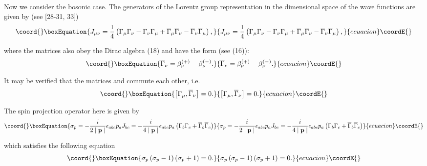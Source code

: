 \documentclass[a4paper,12pt]{article}
\begin{document}
Now we consider the bosonic case. The generators of the Lorentz group
representation in the \coordHE{}dimensional space of the wave functions \coordHE{}
are given by (see [28-31, 33])
\begin{equation}\coord{}\boxEquation{
J_{\mu \nu }=\frac 14\left( \Gamma _\mu \Gamma _\nu -\Gamma _\nu
\Gamma _\mu +\overline{\Gamma }_\mu \overline{\Gamma }_\nu
-\overline{\Gamma }_\nu \overline{\Gamma }_\mu \right) ,
\label{23}
}{
J_{\mu \nu }=\frac 14\left( \Gamma _\mu \Gamma _\nu -\Gamma _\nu
\Gamma _\mu +\overline{\Gamma }_\mu \overline{\Gamma }_\nu
-\overline{\Gamma }_\nu \overline{\Gamma }_\mu \right) ,
}{ecuacion}\coordE{}\end{equation}

where the matrices \myHighlight{$\overline{\Gamma }_\nu $}\coordHE{} also obey the Dirac algebra
(18) and have the form (see (16)):
\begin{equation}\coord{}\boxEquation{
\overline{\Gamma }_\nu =\beta _\nu ^{(+)}-\beta _\nu ^{(-)} .
\label{24}
}{
\overline{\Gamma }_\nu =\beta _\nu ^{(+)}-\beta _\nu ^{(-)} .
}{ecuacion}\coordE{}\end{equation}

It may be verified that the matrices \myHighlight{$\Gamma _\mu $}\coordHE{} and
\myHighlight{$\overline{\Gamma } _\nu $}\coordHE{} commute each other, i.e.
\begin{equation}\coord{}\boxEquation{
\left[ \Gamma _\mu ,\overline{\Gamma }_\nu \right] =0 . \label{25}
}{
\left[ \Gamma _\mu ,\overline{\Gamma }_\nu \right] =0 . }{ecuacion}\coordE{}\end{equation}

The spin projection operator here is given by
\begin{equation}\coord{}\boxEquation{
\sigma _p=-\frac i{2\mid \mathbf{p}\mid }\epsilon
_{abc}p_aJ_{bc}=-\frac i{4\mid \mathbf{p}\mid }\epsilon
_{abc}p_a\left( \Gamma _b\Gamma _c+ \overline{\Gamma
}_b\overline{\Gamma }_c\right)  \label{26}
}{
\sigma _p=-\frac i{2\mid \mathbf{p}\mid }\epsilon
_{abc}p_aJ_{bc}=-\frac i{4\mid \mathbf{p}\mid }\epsilon
_{abc}p_a\left( \Gamma _b\Gamma _c+ \overline{\Gamma
}_b\overline{\Gamma }_c\right)  }{ecuacion}\coordE{}\end{equation}

which satisfies the following equation
\begin{equation}\coord{}\boxEquation{
\sigma _p\left( \sigma _p-1\right) \left( \sigma _p+1\right) =0 .
\label{27}
}{
\sigma _p\left( \sigma _p-1\right) \left( \sigma _p+1\right) =0 .
}{ecuacion}\coordE{}\end{equation}
\end{document}
